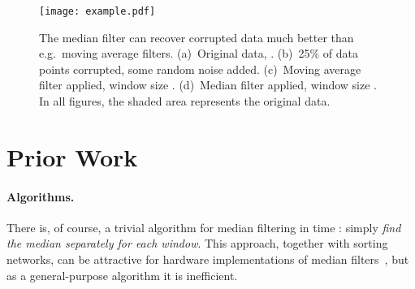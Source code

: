 \documentclass[a4paper,11pt]{article}
\begin{document}
\begin{figure}
    \centering
    \texttt{[image: example.pdf]}
    \caption{The median filter can recover corrupted data much better than e.g.\ moving average filters. (a)~Original data, . (b)~25\% of data points corrupted, some random noise added. (c)~Moving average filter applied, window size . (d)~Median filter applied, window size . In all figures, the shaded area represents the original data.}\label{fig:example}
\end{figure}

\section{Prior Work}

\paragraph{Algorithms.}

There is, of course, a trivial algorithm for median filtering in time : simply \emph{find the median separately for each window}. This approach, together with sorting networks, can be attractive for hardware implementations of median filters~\cite{oflazer83median}, but as a general-purpose algorithm it is inefficient.
\end{document}
